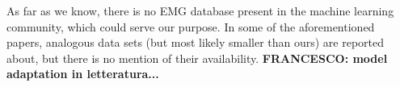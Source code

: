 As far as we know, there is no EMG database present in the machine
learning community, which could serve our purpose. In some of the
aforementioned papers, analogous data sets (but most likely smaller
than ours) are reported about, but there is no mention of their
availability. 
\textbf{FRANCESCO: model adaptation in letteratura...}

